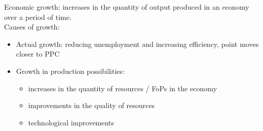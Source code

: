 Economic growth: increases in the quantity of output produced in an economy over a period of time.\\
Causes of growth: 
\begin{itemize}
  \item Actual growth: reducing unemployment and increasing efficiency, point moves closer to PPC
  \item Growth in production possibilities:
  \begin{itemize}
    \item increases in the quantity of resources / FoPs in the economy
    \item improvements in the quality of resources
    \item technological improvements
  \end{itemize}
\end{itemize}


